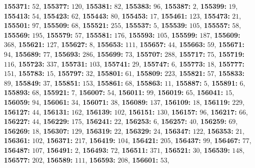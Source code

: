 \textsf{\bfseries 155371:} $52$, \textsf{\bfseries 155377:} $120$, \textsf{\bfseries 155381:} $82$, \textsf{\bfseries 155383:} $96$, \textsf{\bfseries 155387:} $2$, \textsf{\bfseries 155399:} $19$, \textsf{\bfseries 155413:} $54$, \textsf{\bfseries 155423:} $62$, \textsf{\bfseries 155443:} $80$, \textsf{\bfseries 155453:} $17$, \textsf{\bfseries 155461:} $123$, \textsf{\bfseries 155473:} $21$, \textsf{\bfseries 155501:} $97$, \textsf{\bfseries 155509:} $68$, \textsf{\bfseries 155521:} $255$, \textsf{\bfseries 155537:} $5$, \textsf{\bfseries 155539:} $105$, \textsf{\bfseries 155557:} $58$, \textsf{\bfseries 155569:} $195$, \textsf{\bfseries 155579:} $57$, \textsf{\bfseries 155581:} $176$, \textsf{\bfseries 155593:} $105$, \textsf{\bfseries 155599:} $187$, \textsf{\bfseries 155609:} $368$, \textsf{\bfseries 155621:} $127$, \textsf{\bfseries 155627:} $8$, \textsf{\bfseries 155653:} $111$, \textsf{\bfseries 155657:} $44$, \textsf{\bfseries 155663:} $59$, \textsf{\bfseries 155671:} $94$, \textsf{\bfseries 155689:} $77$, \textsf{\bfseries 155693:} $286$, \textsf{\bfseries 155699:} $73$, \textsf{\bfseries 155707:} $288$, \textsf{\bfseries 155717:} $75$, \textsf{\bfseries 155719:} $116$, \textsf{\bfseries 155723:} $337$, \textsf{\bfseries 155731:} $103$, \textsf{\bfseries 155741:} $29$, \textsf{\bfseries 155747:} $6$, \textsf{\bfseries 155773:} $18$, \textsf{\bfseries 155777:} $151$, \textsf{\bfseries 155783:} $15$, \textsf{\bfseries 155797:} $32$, \textsf{\bfseries 155801:} $61$, \textsf{\bfseries 155809:} $223$, \textsf{\bfseries 155821:} $57$, \textsf{\bfseries 155833:} $89$, \textsf{\bfseries 155849:} $37$, \textsf{\bfseries 155851:} $153$, \textsf{\bfseries 155861:} $68$, \textsf{\bfseries 155863:} $11$, \textsf{\bfseries 155887:} $5$, \textsf{\bfseries 155891:} $6$, \textsf{\bfseries 155893:} $68$, \textsf{\bfseries 155921:} $7$, \textsf{\bfseries 156007:} $54$, \textsf{\bfseries 156011:} $99$, \textsf{\bfseries 156019:} $65$, \textsf{\bfseries 156041:} $15$, \textsf{\bfseries 156059:} $94$, \textsf{\bfseries 156061:} $34$, \textsf{\bfseries 156071:} $38$, \textsf{\bfseries 156089:} $137$, \textsf{\bfseries 156109:} $18$, \textsf{\bfseries 156119:} $229$, \textsf{\bfseries 156127:} $44$, \textsf{\bfseries 156131:} $162$, \textsf{\bfseries 156139:} $102$, \textsf{\bfseries 156151:} $130$, \textsf{\bfseries 156157:} $96$, \textsf{\bfseries 156217:} $66$, \textsf{\bfseries 156227:} $44$, \textsf{\bfseries 156229:} $175$, \textsf{\bfseries 156241:} $22$, \textsf{\bfseries 156253:} $6$, \textsf{\bfseries 156257:} $40$, \textsf{\bfseries 156259:} $69$, \textsf{\bfseries 156269:} $18$, \textsf{\bfseries 156307:} $129$, \textsf{\bfseries 156319:} $22$, \textsf{\bfseries 156329:} $24$, \textsf{\bfseries 156347:} $122$, \textsf{\bfseries 156353:} $21$, \textsf{\bfseries 156361:} $102$, \textsf{\bfseries 156371:} $217$, \textsf{\bfseries 156419:} $104$, \textsf{\bfseries 156421:} $205$, \textsf{\bfseries 156437:} $99$, \textsf{\bfseries 156467:} $77$, \textsf{\bfseries 156487:} $107$, \textsf{\bfseries 156491:} $2$, \textsf{\bfseries 156493:} $72$, \textsf{\bfseries 156511:} $371$, \textsf{\bfseries 156521:} $30$, \textsf{\bfseries 156539:} $148$, \textsf{\bfseries 156577:} $202$, \textsf{\bfseries 156589:} $111$, \textsf{\bfseries 156593:} $208$, \textsf{\bfseries 156601:} $53$, 
